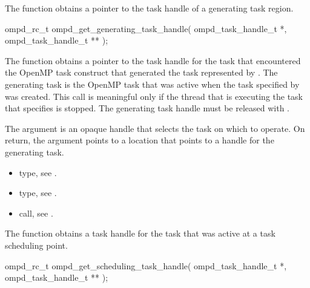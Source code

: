 \label{subsubsubsec:ompd_get_generating_task_handle}

\summary
The  function obtains a pointer 
to the task handle of a generating task region.

\format
\begin{cspecific}
\begin{ompSyntax}
ompd_rc_t ompd_get_generating_task_handle(
  ompd_task_handle_t *,
  ompd_task_handle_t **
);
\end{ompSyntax}
\end{cspecific}


\descr
The  function obtains a pointer to 
the task handle for the task that encountered the OpenMP task construct 
that generated the task represented by . The generating 
task is the OpenMP task that was active when the task specified by 
 was created. This call is meaningful only if the thread 
that is executing the task that  specifies is stopped. 
The generating task handle must be released with .

\argdesc
The  argument is an opaque handle that selects the task on
which to operate. On return, the  argument points
to a location that points to a handle for the generating task.

\crossreferences
\begin{itemize}
\item {} type, see .

\item {} type, see .

\item {} call, 
see .
\end{itemize}



\label{subsubsubsec:ompd_get_scheduling_task_handle}
\summary
The  function obtains a task handle 
for the task that was active at a task scheduling point.

\format
\begin{cspecific}
\begin{ompSyntax}
ompd_rc_t ompd_get_scheduling_task_handle(
  ompd_task_handle_t *,
  ompd_task_handle_t **
);
\end{ompSyntax}
\end{cspecific}

